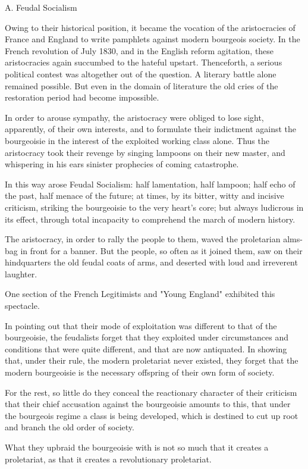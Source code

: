 \documentclass[11pt]{book}
\begin{document}
A. Feudal Socialism

Owing to their historical position, it became the vocation of the
aristocracies of France and England to write pamphlets against
modern bourgeois society.  In the French revolution of July 1830,
and in the English reform agitation, these aristocracies again
succumbed to the hateful upstart.  Thenceforth, a serious political
contest was altogether out of the question.  A literary battle
alone remained possible.  But even in the domain of literature
the old cries of the restoration period had become impossible.

In order to arouse sympathy, the aristocracy were obliged to
lose sight, apparently, of their own interests, and to formulate
their indictment against the bourgeoisie in the interest of the
exploited working class alone.  Thus the aristocracy took their
revenge by singing lampoons on their new master, and whispering
in his ears sinister prophecies of coming catastrophe.

In this way arose Feudal Socialism: half lamentation, half
lampoon; half echo of the past, half menace of the future; at
times, by its bitter, witty and incisive criticism, striking the
bourgeoisie to the very heart's core; but always ludicrous in
its effect, through total incapacity to comprehend the march of
modern history.

The aristocracy, in order to rally the people to them, waved the
proletarian alms-bag in front for a banner.  But the people, so
often as it joined them, saw on their hindquarters the old feudal
coats of arms, and deserted with loud and irreverent laughter.

One section of the French Legitimists and "Young England"
exhibited this spectacle.

In pointing out that their mode of exploitation was different to
that of the bourgeoisie, the feudalists forget that they
exploited under circumstances and conditions that were quite
different, and that are now antiquated.  In showing that, under
their rule, the modern proletariat never existed, they forget
that the modern bourgeoisie is the necessary offspring of their
own form of society.

For the rest, so little do they conceal the reactionary
character of their criticism that their chief accusation against
the bourgeoisie amounts to this, that under the bourgeois regime
a class is being developed, which is destined to cut up root and
branch the old order of society.

What they upbraid the bourgeoisie with is not so much that it
creates a proletariat, as that it creates a revolutionary
proletariat.
\end{document}
